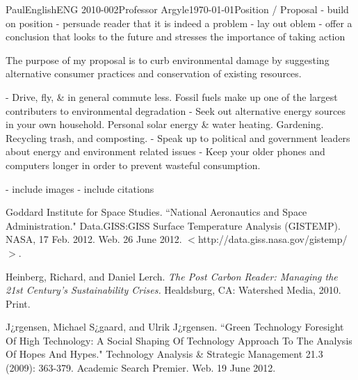 \documentclass[12pt,letterpaper]{article}
\begin{document}
\begin{mla}{Paul}{English}{ENG 2010-002}{Professor Argyle}{\today}{Position / Proposal}
- build on position
- persuade reader that it is indeed a problem
- lay out oblem
- offer a conclusion that looks to the future and stresses the importance of taking action

The purpose of my proposal is to curb environmental damage by
suggesting alternative consumer practices and conservation of existing
resources. 

- Drive, fly, \& in general commute less. Fossil fuels make up one of
  the largest contributers to environmental degradation
- Seek out alternative energy sources in your own household. Personal
  solar energy \& water heating. Gardening. Recycling trash, and
  composting. 
- Speak up to political and government leaders about energy and
  environment related issues
- Keep your older phones and computers longer in order to prevent
  wasteful consumption.

- include images
- include citations


\begin{workscited}

\bibent
Goddard Institute for Space Studies. ``National Aeronautics and Space Administration." Data.GISS:GISS Surface Temperature Analysis (GISTEMP). NASA, 17 Feb. 2012. Web. 26 June 2012. $<$http://data.giss.nasa.gov/gistemp/$>$.

\bibent
Heinberg, Richard, and Daniel Lerch. \textit{The Post Carbon Reader: Managing the 21st Century's Sustainability Crises.} Healdsburg, CA: Watershed Media, 2010. Print.

\bibent
J¿rgensen, Michael S¿gaard, and Ulrik J¿rgensen. ``Green Technology Foresight Of High Technology: A Social Shaping Of Technology Approach To The Analysis Of Hopes And Hypes." Technology Analysis \& Strategic Management 21.3 (2009): 363-379. Academic Search Premier. Web. 19 June 2012.


\end{workscited}
\end{mla}
\end{document}
